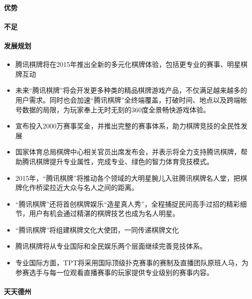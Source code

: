 \documentclass[11pt]{article}
\providecommand{\tightlist}{%
      \setlength{\itemsep}{0pt}\setlength{\parskip}{0pt}}
\begin{document}
\hypertarget{ux4f18ux52bf}{%
\paragraph{优势}\label{ux4f18ux52bf}}

\hypertarget{ux4e0dux8db3}{%
\paragraph{不足}\label{ux4e0dux8db3}}

\hypertarget{ux53d1ux5c55ux89c4ux5212}{%
\paragraph{发展规划}\label{ux53d1ux5c55ux89c4ux5212}}

\begin{itemize}
\tightlist
\item
  腾讯棋牌将在2015年推出全新的多元化棋牌体验，包括更专业的赛事、明星棋牌互动
\item
  未来``腾讯棋牌''将会开发更多种类的精品棋牌游戏产品，不仅满足越来越多的用户需求。同时也会加速``腾讯棋牌''全终端覆盖，打破时间、地点以及跨端帐号数据的局限，为玩家奉上无时无刻的360度全景畅快游戏体验。
\item
  宣布投入2000万赛事奖金，并推出完整的赛事体系，助力棋牌竞技的全民性发展
\item
  国家体育总局棋牌中心相关官员出席发布会，并表示将全力支持腾讯棋牌，帮助腾讯棋牌提升专业属性，完成专业、绿色的智力体育竞技模式。
\item
  2015年，``腾讯棋牌''将推动各个领域的大明星腕儿入驻腾讯棋牌名人堂，把棋牌化作桥梁拉近大众与名人之间的距离。
\item
  ``腾讯棋牌''还将首创棋牌娱乐``造星真人秀''，全程捕捉民间高手过招的精彩细节，用户有机会通过精湛的棋牌技艺也成为名人明星。
\item
  ``腾讯棋牌''将组建棋牌文化大使团，一同传递棋牌文化
\item
  腾讯棋牌将从专业国际和全民娱乐两个层面继续完善竞技体系。
\item
  专业国际方面，TPT将采用国际顶级扑克赛事的赛制及直播团队原班人马，为参赛选手与每一位观看直播赛事的玩家提供专业级别的赛事内容。
\end{itemize}

\hypertarget{ux5929ux5929ux5fb7ux5dde}{%
\paragraph{天天德州}\label{ux5929ux5929ux5fb7ux5dde}}
\end{document}
